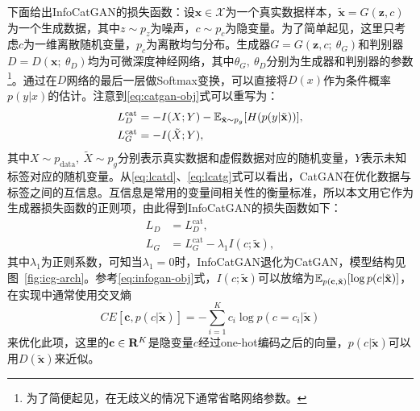 下面给出InfoCatGAN的损失函数：设$\mathbf{x} \in \mathcal{X}$为一个真实数据样本，$\tilde{\mathbf{x}} = G(\mathbf{z}, c)$为一个生成数据，其中$z\sim p_z$为噪声，$c\sim p_c$为隐变量。为了简单起见，这里只考虑$c$为一维离散随机变量，$p_c$为离散均匀分布。生成器$G = G(\mathbf{z}, c; ~\theta_G)$和判别器$D = D(\mathbf{x}; ~\theta_D)$均为可微深度神经网络，其中$\theta_G, ~\theta_D$分别为生成器和判别器的参数\footnote{为了简便起见，在无歧义的情况下通常省略网络参数。}。通过在$D$网络的最后一层做Softmax变换，可以直接将$D(x)$作为条件概率$p(y|x)$的估计。注意到\eqref{eq:catgan-obj}式可以重写为：
\begin{align}
  L_D^{\text{cat}} &= -I(X;Y)-
         \mathbb{E}_{\tilde{\mathbf{x}} \sim p_g}[H(p(y|\tilde{\mathbf{x}}))], \label{eq:lcatd} \\
  L_G^{\text{cat}} &= -I(\tilde{X}; Y), \label{eq:lcatg}
\end{align}
其中$X \sim p_{\text{data}}, ~\tilde{X} \sim p_g$分别表示真实数据和虚假数据对应的随机变量，$Y$表示未知标签对应的随机变量。从\eqref{eq:lcatd}、\eqref{eq:lcatg}式可以看出，CatGAN在优化数据与标签之间的互信息。互信息是常用的变量间相关性的衡量标准，所以本文用它作为生成器损失函数的正则项，由此得到InfoCatGAN的损失函数如下：
\begin{equation}
\label{eq:infocatgan}
\begin{split}
  L_D &= L_D^{\text{cat}}, \\ 
  L_G &= L_G^{\text{cat}} - \lambda_1 I(c; \tilde{\mathbf{x}}),
\end{split}
\end{equation}
其中$\lambda_1$为正则系数，可知当$\lambda_1 = 0$时，InfoCatGAN退化为CatGAN，模型结构见图~\ref{fig:icg-arch}。参考\eqref{eq:infogan-obj}式，$I(c; \tilde{\mathbf{x}})$可以放缩为$\mathbb{E}_{p(\mathbf{c},\tilde{\mathbf{x}})}[\log p(c|\tilde{\mathbf{x}})]$，在实现中通常使用交叉熵
\begin{equation}
  CE[\mathbf{c}, p(c|\tilde{\mathbf{x}})] = -\sum_{i=1}^K c_i \log p(c=c_i | \tilde{\mathbf{x}})
\end{equation}
来优化此项，这里的$\mathbf{c} \in \mathbf{R}^K$是隐变量$c$经过one-hot编码之后的向量，$p(c|\tilde{\mathbf{x}})$可以用$D(\tilde{\mathbf{x}})$来近似。


